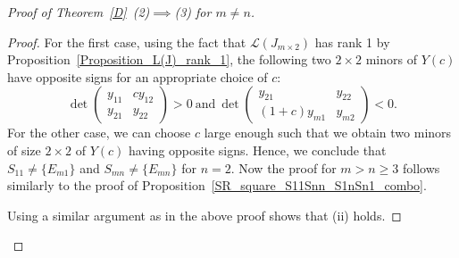 \documentclass[11pt,reqno]{amsart}
\theoremstyle{plain}
\theoremstyle{definition}
\numberwithin{equation}{section}
\begin{document}
\begin{proof}[Proof of Theorem~\ref{D}~(2)$\implies$(3) for $m\neq n$]
\begin{proof}
	For the first case, using the fact that $\mathcal{L}(J_{m\times2})$ has rank 1 by Proposition~\ref{Proposition_L(J)_rank_1}, the following two $2\times2$ minors of $Y(c)$ have opposite signs for an appropriate choice of $c$:
		\[\det\begin{pmatrix}
			y_{11} & cy_{12} \\
			y_{21} & y_{22} 
		\end{pmatrix}>0~\text{and}~
		\det\begin{pmatrix}
			y_{21} & y_{22} \\
			(1+c)y_{m1} & y_{m2} 
		\end{pmatrix}<0.\]
	For the other case, we can choose $c$ large enough such that we obtain two minors of size $2\times2$ of $Y(c)$ having opposite signs. Hence, we conclude that $S_{11}\neq\{E_{m1}\}$ and $S_{mn}\neq\{E_{mn}\}$ for $n=2$. Now the proof for $m>n\geq3$ follows similarly to the proof of Proposition~\ref{SR_square_S11Snn_S1nSn1_combo}.
	
	Using a similar argument as in the above proof shows that (ii) holds.
	\end{proof}


\end{proof}
\end{document}

